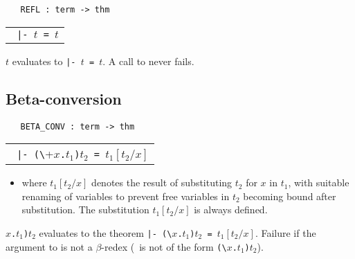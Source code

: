 \begin{boxed}
\begin{verbatim}
   REFL : term -> thm
\end{verbatim}\end{boxed}

\begin{center}
\begin{tabular}{c}
  \\ \hline
{\small\verb+ |- +}$t${\small\verb+ = +}$t$ \\
\end{tabular}
\end{center}

$t${\small\verb++} evaluates to
{\small\verb+|- +}$t${\small\verb+ = +}$t$. A call to  never fails.

\bigskip

\subsection{Beta-conversion}

\begin{boxed}
\begin{verbatim}
   BETA_CONV : term -> thm
\end{verbatim}\end{boxed}

\begin{center}
\begin{tabular}{c}
  \\ \hline
{\small\verb+ |- (\+}$x${\small\verb+.+}$t_1${\small\verb+)+}$t_2${\small\verb+ = +}$t_1[t_2/x]$
\end{tabular}
\end{center}

\begin{itemize}
\item where $t_1[t_2/x]$ denotes the result of substituting $t_2$ for $x$
in $t_1$, with suitable renaming of variables to prevent free variables
in $t_2$ becoming bound after substitution. The substitution
 $t_1[t_2/x]$ is always defined.
\end{itemize}


$x${\small\verb+.+}$t_1${\small\verb+)+}$t_2${\small\verb++} evaluates to the
theorem {\small\verb+|- (\+}$x${\small\verb+.+}$t_1${\small\verb+)+}$t_2${\small\verb+ = +}$t_1[t_2/x]$.
Failure if the argument to  is not a $\beta$-redex (\ie\ is not
of the form {\small\verb+(\+}$x${\small\verb+.+}$t_1${\small\verb+)+}$t_2${\small\verb++}).

